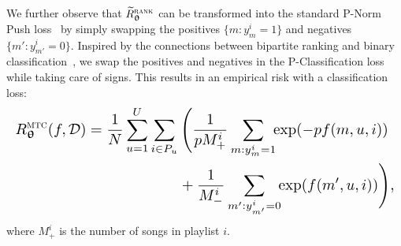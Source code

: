 

We further observe that $\widetilde R_{{\bm{\uptheta}}}^{\textsc{rank}}$ can be transformed into the standard P-Norm Push loss~\cite{rudin2009p} 
by simply swapping the positives {\small $\{m: y_m^i = 1\}$} and negatives {\small $\{m': y_{m'}^i = 0\}$}. %
Inspired by the connections between bipartite ranking and binary classification~\cite{menon2016bipartite},
we swap the positives and negatives in the P-Classification loss~\cite{ertekin2011equivalence} while taking care of signs.
This results in an empirical risk with a classification loss:
\begin{equation}
\label{eq:clfrisk}
\resizebox{\columnwidth}{!}{$\displaystyle
\begin{aligned}
R_{\upthetabm}^{\textsc{mtc}}(f, \DCal)
= \frac{1}{N} \sum_{u=1}^U 
& \sum_{i \in P_u} \Bigg(
  \frac{1}{p M_+^i} \sum_{m: y_m^i = 1} \!\! \exp(-p f(m, u, i)) \\
& \hspace{2em}  + \frac{1}{M_-^i} \sum_{m': y_{m'}^i = 0} \!\! \exp(f(m', u, i)) \Bigg),
\end{aligned}
$}
\end{equation}
where $M_+^i$ is the number of songs in playlist $i$.


